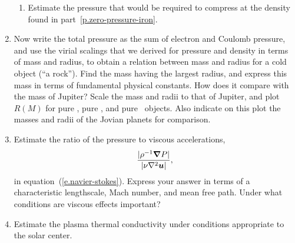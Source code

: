 \begin{enumerate}
\begin{enumerate}
\item Estimate the pressure that would be required to compress \iron[56] at the density found in part~\ref{p.zero-pressure-iron}.
\end{enumerate}

\item Now write the total pressure as the sum of electron and Coulomb pressure, and use the virial scalings that we derived for pressure and density in terms of mass and radius, to obtain a relation between mass and radius for a cold object (``a rock'').  Find the mass having the largest radius, and express this mass in terms of fundamental physical constants.  How does it compare with the mass of Jupiter?  Scale the mass and radii to that of Jupiter, and plot $R(M)$ for pure \hydrogen, pure \helium, and pure \carbon\ objects.  Also indicate on this plot the masses and radii of the Jovian planets for comparison.

\item Estimate the ratio of the pressure to viscous accelerations,
\[ \frac{|\rho^{-1}\boldsymbol{\nabla} P|}{|\nu\nabla^{2}\boldsymbol{u}|} ,\]
in equation~(\ref{e.navier-stokes}).  Express your answer in terms of a characteristic lengthscale, Mach number, and mean free path.  Under what conditions are viscous effects important?

\item Estimate the plasma thermal conductivity under conditions appropriate to the solar center.

\end{enumerate}
